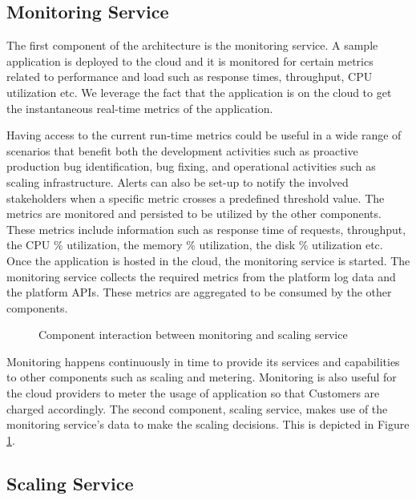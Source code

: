 \documentclass[article,type=msc,colorback,12pt,accentcolor=tud8b,table]{tudthesis}
\begin{document}
	\subsection{Monitoring Service} 
 	The first component of the architecture is the monitoring service. A sample application is deployed to the cloud and it is monitored for certain metrics related to performance and load such as response times, throughput, CPU utilization etc. We leverage the fact that the application is on the cloud to get the instantaneous real-time metrics of the application. 
 	\par Having access to the current run-time metrics could be useful in a wide range of scenarios that benefit both the development activities such as proactive production bug identification, bug fixing, and operational activities such as scaling infrastructure. Alerts can also be set-up to notify the involved stakeholders when a specific metric crosses a predefined threshold value. The metrics are monitored and persisted to be utilized by the other components. These metrics include information such as response time of requests, throughput, the CPU \% utilization, the memory \% utilization, the disk \% utilization etc. Once the application is hosted in the cloud, the monitoring service is started. 	The monitoring service collects the required metrics from the platform log data and the platform APIs. These metrics are aggregated to be consumed by the other components. 
 	
 	 	 \begin{figure}[!h]
 	 	 	\begin{center}
 	 	 		\makebox[\textwidth]{\texttt{[image: C4]}}
 	 	 	\end{center}
 	 	 	\caption{Component interaction between monitoring and scaling service}
 	 	 	\label{fig:monitor_scaling}
 	 	 \end{figure}
 	 	 
 	 	 Monitoring happens continuously in time to provide its services and capabilities to other components such as scaling and metering. Monitoring is also useful for the cloud providers to meter the usage of application so that Customers are charged accordingly. The second component, scaling service, makes use of the monitoring service's data to make the scaling decisions. This is depicted in Figure \ref{fig:monitor_scaling}.
 	
 	\subsection{Scaling Service}
 	
\end{document}

